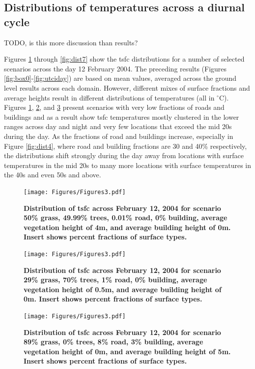 \documentclass[final,3p,times,authoryear]{elsarticle}
\begin{document}
\subsection{Distributions of temperatures across a diurnal cycle}\label{sec:resultsdist}
TODO, is this more discussion than results?

Figures \ref{fig:dist1} through \ref{fig:dist7} show the \gls{tsfc} distributions for a number of selected scenarios across the day 12 February 2004. The preceding results (Figures \ref{fig:box0}-\ref{fig:utciday}) are based on mean values, averaged across the ground level results across each domain. However, different mixes of surface fractions and average heights result in different distributions of temperatures (all in $^{\circ}$C). Figures \ref{fig:dist1}, \ref{fig:dist3}, and \ref{fig:dist5} present scenarios with very low fractions of roads and buildings and as a result show \gls{tsfc} temperatures mostly clustered in the lower ranges across day and night and very few locations that exceed the mid 20s during the day. As the fractions of road and buildings increase, especially in Figure \ref{fig:dist4}, where road and building fractions are 30 and 40\% respectively, the distributions shift strongly during the day away from locations with surface temperatures in the mid 20s to many more locations with surface temperatures in the 40s and even 50s and above.
 

\begin{figure}
\centering
\texttt{[image: Figures/Figures3.pdf]}
\caption{\bf Distribution of \gls{tsfc} across February 12, 2004 for scenario 50\% grass, 49.99\% trees, 0.01\% road, 0\% building, average vegetation height of 4m, and average building height of 0m. Insert shows percent fractions of surface types.}
 \label{fig:dist1}
\end{figure}

\begin{figure}
\centering
\texttt{[image: Figures/Figures3.pdf]}
\caption{\bf Distribution of \gls{tsfc} across February 12, 2004 for scenario 29\% grass, 70\% trees, 1\% road, 0\% building, average vegetation height of 0.5m, and average building height of 0m. Insert shows percent fractions of surface types.}
 \label{fig:dist3}
\end{figure}

\begin{figure}
\centering
\texttt{[image: Figures/Figures3.pdf]}
\caption{\bf Distribution of \gls{tsfc} across February 12, 2004 for scenario 89\% grass, 0\% trees, 8\% road, 3\% building, average vegetation height of 0m, and average building height of 5m. Insert shows percent fractions of surface types.}
 \label{fig:dist5}
\end{figure}
\end{document}
